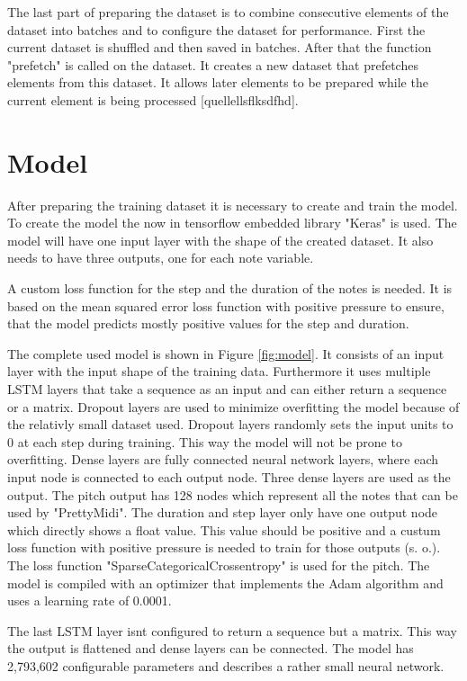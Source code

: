 The last part of preparing the dataset is to combine consecutive elements of the dataset into batches and to configure
the dataset for performance. First the current dataset is shuffled and then saved in batches. After that the function
"prefetch" is called on the dataset. It creates a new dataset that prefetches elements from this dataset. It allows later 
elements to be prepared while the current element is being processed [quellellsflksdfhd].

\section{Model}
\label{model}

After preparing the training dataset it is necessary to create and train the model. To create the model the now in tensorflow
embedded library "Keras" is used. The model will have one input layer with the shape of the created dataset. It also needs 
to have three outputs, one for each note variable.

A custom loss function for the step and the duration of the notes is needed. It is based on the mean squared error loss function
with positive pressure to ensure, that the model predicts mostly positive values for the step and duration. 

The complete used model is shown in Figure \ref{fig:model}. It consists of an input layer with the input shape of the training data.
Furthermore it uses multiple LSTM layers that take a sequence as an input and can either return a sequence or a matrix. Dropout layers are
used to minimize overfitting the model because of the relativly small dataset used. Dropout layers randomly sets the input units to 0
at each step during training. This way the model will not be prone to overfitting. Dense layers are fully connected neural network
layers, where each input node is connected to each output node. Three dense layers are used as the output. The pitch output has 128 nodes 
which represent all the notes that can be used by "PrettyMidi". The duration and step layer only have one output node which
directly shows a float value. This value should be positive and a custum loss function with positive pressure is needed to train
for those outputs (s. o.). The loss function "SparseCategoricalCrossentropy" is used for the pitch. The model is compiled with
an optimizer that implements the Adam algorithm and uses a learning rate of 0.0001.

The last LSTM layer isnt configured to return a sequence but a matrix. This way the output is flattened and dense layers can be connected.
The model has 2,793,602 configurable parameters and describes a rather small neural network.


